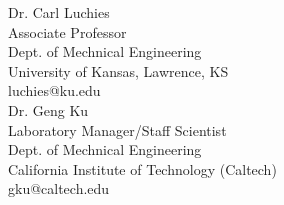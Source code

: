\documentclass[10pt,letter]{article}
\begin{document}
\begin{small}
\begin{footnotesize}
\begin{multicols}{2}
\columnbreak

\noindent 
Dr. Carl Luchies \\
Associate Professor \\
Dept. of Mechnical Engineering \\
University of Kansas, Lawrence, KS \\
luchies@ku.edu \\

\noindent
Dr. Geng Ku \\
Laboratory Manager/Staff Scientist \\
Dept. of Mechnical Engineering \\
California Institute of Technology (Caltech) \\
gku@caltech.edu \\

\end{multicols}

%
%
%

\end{footnotesize}
\end{small}
\end{document}
